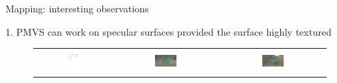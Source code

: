 \documentclass[10pt]{beamer}
\begin{document}
\begin{frame}{Mapping: interesting observations}


\begin{exampleblock}{1. PMVS can work on specular surfaces provided the surface highly textured}
\begin{figure}
\begin{tabular}{ccc}
\includegraphics[width=0.22\textwidth]{mapping/mvs_spec/mvs_spec}&
\includegraphics[width=0.22\textwidth]{mapping/mvs_spec/mvs_spec_01}&
\includegraphics[width=0.22\textwidth]{mapping/mvs_spec/mvs_spec_00}\\
\end{tabular}
\end{figure}
\end{exampleblock}


\end{frame}
\end{document}
